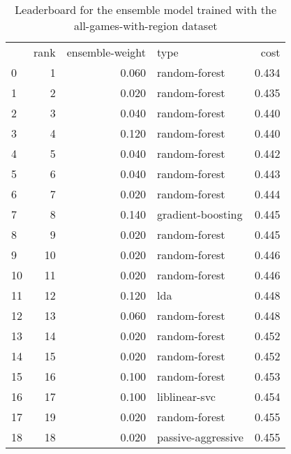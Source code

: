 \begin{table}[]
	\centering
	\begin{tabular}{lrrlr}
		   & rank & ensemble-weight & type               & cost  \\
		0  & 1    & 0.060           & random-forest      & 0.434 \\
		1  & 2    & 0.020           & random-forest      & 0.435 \\
		2  & 3    & 0.040           & random-forest      & 0.440 \\
		3  & 4    & 0.120           & random-forest      & 0.440 \\
		4  & 5    & 0.040           & random-forest      & 0.442 \\
		5  & 6    & 0.040           & random-forest      & 0.443 \\
		6  & 7    & 0.020           & random-forest      & 0.444 \\
		7  & 8    & 0.140           & gradient-boosting  & 0.445 \\
		8  & 9    & 0.020           & random-forest      & 0.445 \\
		9  & 10   & 0.020           & random-forest      & 0.446 \\
		10 & 11   & 0.020           & random-forest      & 0.446 \\
		11 & 12   & 0.120           & lda                & 0.448 \\
		12 & 13   & 0.060           & random-forest      & 0.448 \\
		13 & 14   & 0.020           & random-forest      & 0.452 \\
		14 & 15   & 0.020           & random-forest      & 0.452 \\
		15 & 16   & 0.100           & random-forest      & 0.453 \\
		16 & 17   & 0.100           & liblinear-svc      & 0.454 \\
		17 & 19   & 0.020           & random-forest      & 0.455 \\
		18 & 18   & 0.020           & passive-aggressive & 0.455 \\
	\end{tabular}

	\caption{Leaderboard for the ensemble model trained with the all-games-with-region dataset}
	\label{tab:lb-all-games-with-region}
\end{table}


